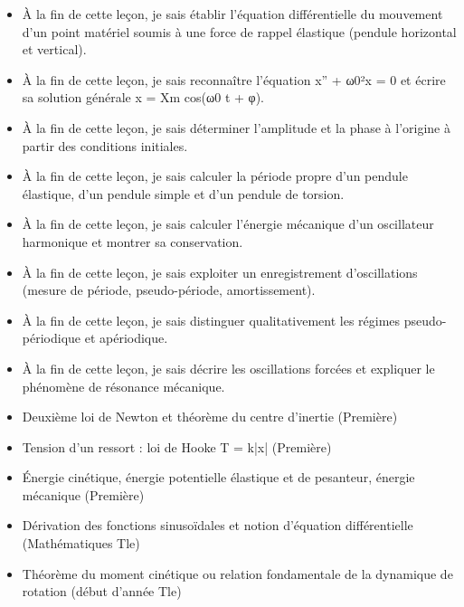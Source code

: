 \documentclass[11pt]{article}
\begin{document}
\begin{objectifs}
\begin{itemize}
\item À la fin de cette leçon, je sais établir l'équation différentielle du mouvement d'un point matériel soumis à une force de rappel élastique (pendule horizontal et vertical).
\item À la fin de cette leçon, je sais reconnaître l'équation x'' + ω0²x = 0 et écrire sa solution générale x = Xm cos(ω0 t + φ).
\item À la fin de cette leçon, je sais déterminer l'amplitude et la phase à l'origine à partir des conditions initiales.
\item À la fin de cette leçon, je sais calculer la période propre d'un pendule élastique, d'un pendule simple et d'un pendule de torsion.
\item À la fin de cette leçon, je sais calculer l'énergie mécanique d'un oscillateur harmonique et montrer sa conservation.
\item À la fin de cette leçon, je sais exploiter un enregistrement d'oscillations (mesure de période, pseudo-période, amortissement).
\item À la fin de cette leçon, je sais distinguer qualitativement les régimes pseudo-périodique et apériodique.
\item À la fin de cette leçon, je sais décrire les oscillations forcées et expliquer le phénomène de résonance mécanique.
\end{itemize}
\end{objectifs}

\begin{prerequis}
\begin{itemize}
\item Deuxième loi de Newton et théorème du centre d'inertie (Première)
\item Tension d'un ressort : loi de Hooke T = k|x| (Première)
\item Énergie cinétique, énergie potentielle élastique et de pesanteur, énergie mécanique (Première)
\item Dérivation des fonctions sinusoïdales et notion d'équation différentielle (Mathématiques Tle)
\item Théorème du moment cinétique ou relation fondamentale de la dynamique de rotation (début d'année Tle)
\end{itemize}
\end{prerequis}

\newpage
\end{document}
